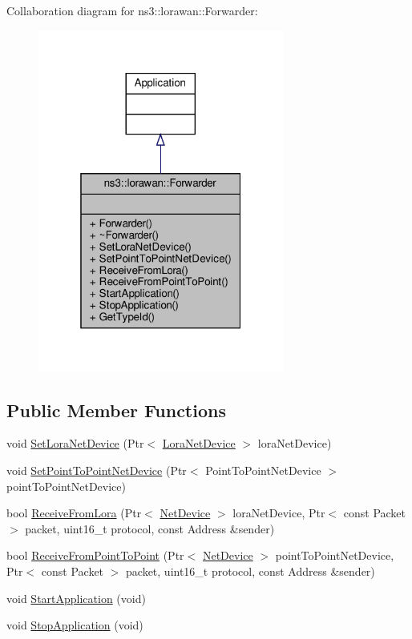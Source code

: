 Collaboration diagram for ns3\+:\+:lorawan\+:\+:Forwarder\+:
\nopagebreak
\begin{figure}[H]
\begin{center}
\leavevmode
\includegraphics[width=229pt]{classns3_1_1lorawan_1_1Forwarder__coll__graph}
\end{center}
\end{figure}
\subsection*{Public Member Functions}
\begin{DoxyCompactItemize}
\item 
void \hyperlink{classns3_1_1lorawan_1_1Forwarder_ac945060ea56bc2bd25d2b4ff18d80a2d}{Set\+Lora\+Net\+Device} (Ptr$<$ \hyperlink{classns3_1_1lorawan_1_1LoraNetDevice}{Lora\+Net\+Device} $>$ lora\+Net\+Device)
\item 
void \hyperlink{classns3_1_1lorawan_1_1Forwarder_a05e97fcfcdeafe425477f6e0c06509f8}{Set\+Point\+To\+Point\+Net\+Device} (Ptr$<$ Point\+To\+Point\+Net\+Device $>$ point\+To\+Point\+Net\+Device)
\item 
bool \hyperlink{classns3_1_1lorawan_1_1Forwarder_a92407f3228e9cf5b1b84cc7d62dff2c2}{Receive\+From\+Lora} (Ptr$<$ \hyperlink{classNetDevice}{Net\+Device} $>$ lora\+Net\+Device, Ptr$<$ const Packet $>$ packet, uint16\+\_\+t protocol, const Address \&sender)
\item 
bool \hyperlink{classns3_1_1lorawan_1_1Forwarder_a004f5126baf8e3a264cab68f59921f77}{Receive\+From\+Point\+To\+Point} (Ptr$<$ \hyperlink{classNetDevice}{Net\+Device} $>$ point\+To\+Point\+Net\+Device, Ptr$<$ const Packet $>$ packet, uint16\+\_\+t protocol, const Address \&sender)
\item 
void \hyperlink{classns3_1_1lorawan_1_1Forwarder_ae94ef5057f8c5fb01db2c6c7ed17eb9d}{Start\+Application} (void)
\item 
void \hyperlink{classns3_1_1lorawan_1_1Forwarder_a8980a4b970c9b20e3ef27d2ab6d3d1d9}{Stop\+Application} (void)
\end{DoxyCompactItemize}
